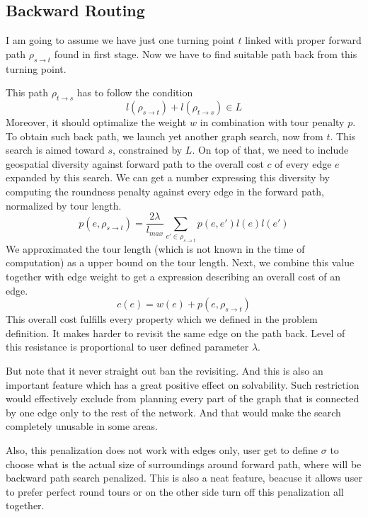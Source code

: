 \documentclass{ctuthesis}
\begin{document}
\subsection{Backward Routing} \label{sec:back}
I am going to assume we have just one turning point \(t\) linked with proper forward path \(\rho_{s \rightarrow t}\) found in first stage. Now we have to find suitable path back from this turning point.\par
This path \(\rho_{t \rightarrow s}\) has to follow the condition 
\begin{equation}
l(\rho_{s \rightarrow t}) + l(\rho_{t \rightarrow s}) \in L
\end{equation}
Moreover, it should optimalize the weight \(w\) in combination with tour penalty \(p\). To obtain such back path, we launch yet another graph search, now from \(t\). This search is aimed toward \(s\), constrained by \(L\). On top of that, we need to include geospatial diversity against forward path to the overall cost \(c\) of every edge \(e\) expanded by this search. We can get a number expressing this diversity by computing the roundness penalty against every edge in the forward path, normalized by tour length.
\begin{equation}
p(e, \rho_{s \rightarrow t}) = \frac {2 \lambda} {l_{max}} \sum_{e' \in \rho_{s \rightarrow t}} {p(e, e') l(e) l(e')}
\end{equation}
 We approximated the tour length (which is not known in the time of computation) as a upper bound on the tour length. Next, we combine this value together with edge weight to get a expression describing an overall cost of an edge.
\begin{equation}
c(e) = w(e) + p(e, \rho_{s \rightarrow t})
\end{equation}
This overall cost fulfills every property which we defined in the problem definition. It makes harder to revisit the same edge on the path back. Level of this resistance is proportional to user defined parameter \(\lambda\). \par But note that it never straight out ban the revisiting. And this is also an important feature which has a great positive effect on solvability. Such restriction would effectively exclude from planning every part of the graph that is connected by one edge only to the rest of the network. And that would make the search completely unusable in some areas. \par
Also, this penalization does not work with edges only, user get to define \(\sigma\) to choose what is the actual size of surroundings around forward path, where will be backward path search penalized. This is also a neat feature, beacuse it allows user to prefer perfect round tours or on the other side turn off this penalization all together.\par
\end{document}
